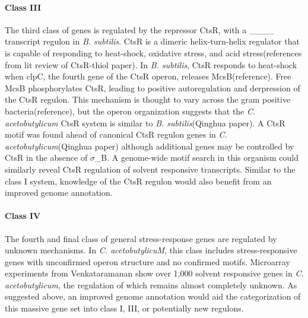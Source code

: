 \paragraph{Class III}
The third class of genes is regulated by the repressor CtsR, with a ____ transcript regulon in \textit{B. subtilis}. CtsR is a dimeric helix-turn-helix regulator that is capable of responding to heat-shock, oxidative stress, and acid stress(references from lit review of CtsR-thiol paper). In \textit{B. subtilis}, CtsR responds to heat-shock when clpC, the fourth gene of the CtsR operon, releases McsB(reference). Free McsB phosphorylates CtsR, leading to positive autoregulation and derpression of the CtsR regulon. This mechanism is thought to vary across the gram positive bacteria(reference), but the operon organization suggests that the \textit{C. acetobutylicum} CtsR system is similar to \textit{B. subtilis}(Qinghua paper). A CtsR motif was found ahead of canonical CtsR regulon genes in \textit{C. acetobutylicum}(Qinghua paper) although additional genes may be controlled by CtsR in the absence of $\sigma$_{B}. A genome-wide motif search in this organism could similarly reveal CtsR regulation of solvent responsive transcripts. Similar to the class I system, knowledge of the CtsR regulon would also benefit from an improved genome annotation.

\paragraph{Class IV}
The fourth and final class of general stress-response genes are regulated by unknown mechanisms. In \textit{C. acetobutylicuM}, this class includes stress-responsive genes with unconfirmed operon structure and no confirmed motifs. Microarray experiments from Venkataramanan show over 1,000 solvent responsive genes in \textit{C. acetobutylicum}, the regulation of which remains almost completely unknown. As suggested above, an improved genome annotation would aid the categorization of this massive gene set into class I, III, or potentially new regulons.

